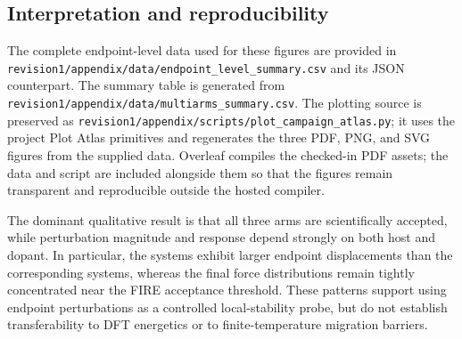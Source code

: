 \subsection{Interpretation and reproducibility}

The complete endpoint-level data used for these figures are provided in
\texttt{revision1/appendix/data/endpoint\_level\_summary.csv} and its JSON
counterpart.  The summary table is generated from
\texttt{revision1/appendix/data/multiarms\_summary.csv}.  The plotting source
is preserved as
\texttt{revision1/appendix/scripts/plot\_campaign\_atlas.py}; it uses the
project Plot Atlas primitives and regenerates the three PDF, PNG, and SVG
figures from the supplied data.  Overleaf compiles the checked-in PDF assets;
the data and script are included alongside them so that the figures remain
transparent and reproducible outside the hosted compiler.

The dominant qualitative result is that all three arms are scientifically
accepted, while perturbation magnitude and response depend strongly on both
host and dopant.  In particular, the  systems exhibit larger
endpoint displacements than the corresponding  systems, whereas
the final force distributions remain tightly concentrated near the FIRE
acceptance threshold.  These patterns support using endpoint perturbations as
a controlled local-stability probe, but do not establish transferability to
DFT energetics or to finite-temperature migration barriers.
